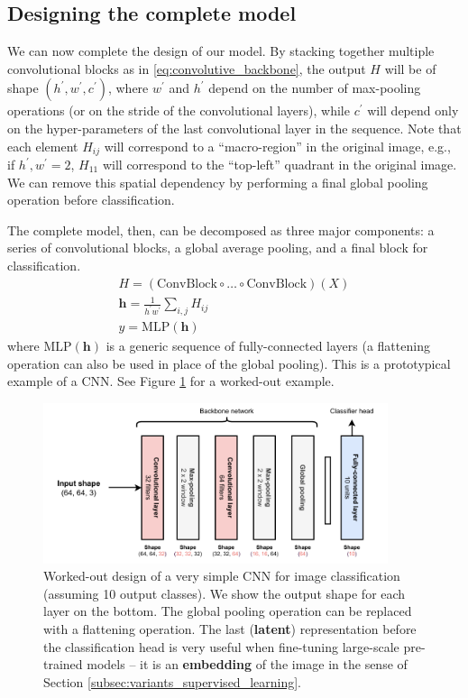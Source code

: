 \subsection{Designing the complete model}

We can now complete the design of our model. By stacking together multiple convolutional blocks as in \eqref{eq:convolutive_backbone}, the output $H$ will be of shape $(h^\prime, w^\prime, c^\prime)$, where $w^\prime$ and $h^\prime$ depend on the number of max-pooling operations (or on the stride of the convolutional layers), while $c^\prime$ will depend only on the hyper-parameters of the last convolutional layer in the sequence. Note that each element $H_{ij}$ will correspond to a “macro-region” in the original image, e.g., if $h^\prime, w^\prime = 2$, $H_{11}$ will correspond to the “top-left” quadrant in the original image. We can remove this spatial dependency by performing a final global pooling operation before classification. 

The complete model, then, can be decomposed as three major components: a series of convolutional blocks, a global average pooling, and a final block for classification.
%
\begin{align} 
H = (\text{ConvBlock}\circ\ldots\circ\text{ConvBlock})(X) \label{eq:conv_blocks} \\
\mathbf{h}= \frac{1}{h^\prime w^\prime}\sum_{i,j}H_{ij}  \label{eq:global_avg_pooling} \\ 
y=\text{MLP}(\mathbf{h}) \label{eq:classification_head}
\end{align}
%
where $\text{MLP}(\mathbf{h})$ is a generic sequence of fully-connected layers (a flattening operation can also be used in place of the global pooling). This is a prototypical example of a CNN. See Figure \ref{fig:cnn_architecture} for a worked-out example.

\begin{figure}
    \centering
    \includegraphics[width=0.9\textwidth]{images/CNN_architecture}
    \caption{Worked-out design of a very simple CNN for image classification (assuming 10 output classes). We show the output shape for each layer on the bottom. The global pooling operation can be replaced with a flattening operation. The last (\textbf{latent}) representation before the classification head is very useful when fine-tuning large-scale pre-trained models -- it is an \textbf{embedding} of the image in the sense of Section \ref{subsec:variants_supervised_learning}.}
    \label{fig:cnn_architecture}
\end{figure}


